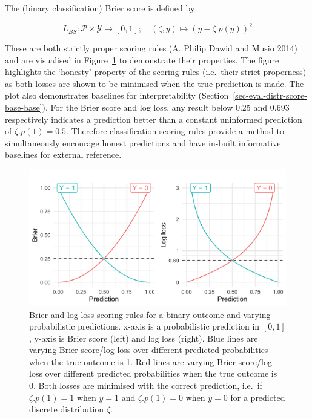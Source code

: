 \documentclass[
  letterpaper,
]{scrbook}
\theoremstyle{plain}
\theoremstyle{definition}
\theoremstyle{remark}
\begin{document}
The (binary classification) Brier score is defined by

\[
L_{BS}:\mathcal{P}\times \mathcal{Y}\rightarrow [0,1]; \quad
(\zeta, y) \mapsto (y - \zeta.p(y))^2
\]

These are both strictly proper scoring rules (A. Philip Dawid and Musio
2014) and are visualised in Figure~\ref{fig-eval-brierlog} to
demonstrate their properties. The figure highlights the `honesty'
property of the scoring rules (i.e.~their strict properness) as both
losses are shown to be minimised when the true prediction is made. The
plot also demonstrates baselines for interpretability
(Section~\ref{sec-eval-distr-score-base-base}). For the Brier score and
log loss, any result below 0.25 and 0.693 respectively indicates a
prediction better than a constant uninformed prediction of
\(\zeta.p(1) = 0.5\). Therefore classification scoring rules provide a
method to simultaneously encourage honest predictions and have in-built
informative baselines for external reference.

\begin{figure}

{\centering \includegraphics{./images/evaluation/brier_logloss.png}

}

\caption{\label{fig-eval-brierlog}Brier and log loss scoring rules for a
binary outcome and varying probabilistic predictions. x-axis is a
probabilistic prediction in \([0,1]\), y-axis is Brier score (left) and
log loss (right). Blue lines are varying Brier score/log loss over
different predicted probabilities when the true outcome is 1. Red lines
are varying Brier score/log loss over different predicted probabilities
when the true outcome is 0. Both losses are minimised with the correct
prediction, i.e.~if \(\zeta.p(1) = 1\) when \(y = 1\) and
\(\zeta.p(1) = 0\) when \(y = 0\) for a predicted discrete distribution
\(\zeta\).}

\end{figure}
\end{document}
